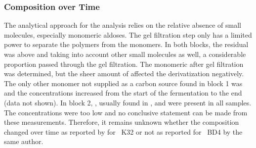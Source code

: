 \subsubsection{\EPS{} Composition over Time}
The analytical approach for the \eps{} \amc{} analysis relies on the relative absence of small molecules, especially monomeric aldoses. The gel filtration step only has a limited power to separate the polymers from the monomers. In both blocks, the residual \glc{} was above  and taking into account other small molecules as well, a considerable proportion passed through the gel filtration. The monomeric \glc{} after gel filtration was determined, but the sheer amount of \glc{} affected the derivatization negatively. The only other monomer not supplied as a carbon source found in block 1 was \man{} and the concentrations increased from the start of the fermentation to the end (data not shown). In block 2, \gal{}, usually found in \lch{} \cite{Duff1996}, and \rha{} were present in all samples. The concentrations were too low and no conclusive statement can be made from these measurements. Therefore, it remains unknown whether the \eps{} composition changed over time as reported by \textcite{Bryan1986} for ~K32 or not as reported for ~BD4 by the same author.

